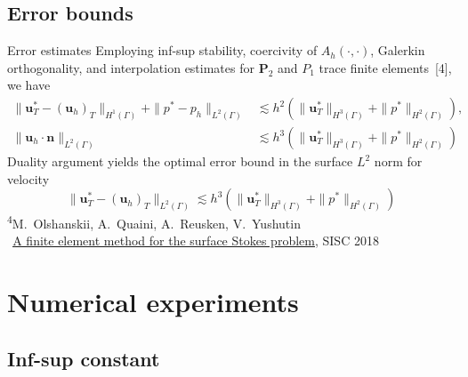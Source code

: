 \documentclass[svgnames]{beamer} %
\newcommand{\vect}[1]{\boldsymbol{\mathbf{#1}}}
\newcommand{\bn}{\mathbf n}
\newcommand{\bu}{\mathbf u}
\begin{document}
	\subsection{Error bounds}
	
	\begin{frame}{Error estimates}
		Employing inf-sup stability, coercivity of $A_h(\cdot, \cdot)$, Galerkin orthogonality, and interpolation estimates for $\vect P_2$ and $P_1$ trace finite elements~[4], we have
		\begin{align*}
		\|\bu_T^\ast  -(\bu_h)_T\|_{H^1(\Gamma)}  + \|p^\ast  - p_h \|_{L^2(\Gamma)}  &\lesssim h^2 (\|\bu_T^\ast\|_{H^3(\Gamma)} +\|p^\ast\|_{H^2(\Gamma)}), \\
		\|\bu_h\cdot\bn \|_{L^2(\Gamma)}  &\lesssim h^3 (\|\bu_T^\ast\|_{H^3(\Gamma)} +\|p^\ast\|_{H^2(\Gamma)})
		\end{align*}
		Duality argument yields the optimal error bound in the surface $L^2$ norm for velocity
		\begin{equation*}
		\|\bu_T^\ast  - (\bu_h)_T\|_{L^2(\Gamma)} \lesssim h^{3}(\|\bu_T^\ast\|_{H^3(\Gamma)} +\|p^\ast\|_{H^2(\Gamma)})
		\end{equation*}
		\vfill
		\tiny{
			\textsuperscript{4}M.~Olshanskii, A.~Quaini, A.~Reusken, V.~Yushutin\\
			$\:\:$\href{https://arxiv.org/abs/1801.06589}{\ul{A finite element method for the surface Stokes problem}}, SISC 2018
		}
	\end{frame}
	
	\section{Numerical experiments}
	
	\subsection{Inf-sup constant}
	
\end{document}
